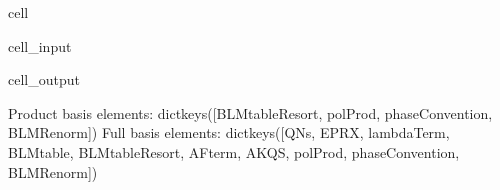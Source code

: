 \documentclass[letterpaper,table,10pt,english]{jupyterBook}
\begin{document}
\begin{sphinxuseclass}{cell}
\begin{sphinxVerbatimInput}
\begin{sphinxuseclass}{cell_input}
\begin{sphinxVerbatim}[commandchars=\\\{\}]
  
\end{sphinxVerbatim}

\end{sphinxuseclass}\end{sphinxVerbatimInput}
\begin{sphinxVerbatimOutput}

\begin{sphinxuseclass}{cell_output}
\begin{sphinxVerbatim}[commandchars=\\\{\}]
Product basis elements: dict\PYGZus{}keys([\PYGZsq{}BLMtableResort\PYGZsq{}, \PYGZsq{}polProd\PYGZsq{}, \PYGZsq{}phaseConvention\PYGZsq{}, \PYGZsq{}BLMRenorm\PYGZsq{}])
Full basis elements: dict\PYGZus{}keys([\PYGZsq{}QNs\PYGZsq{}, \PYGZsq{}EPRX\PYGZsq{}, \PYGZsq{}lambdaTerm\PYGZsq{}, \PYGZsq{}BLMtable\PYGZsq{}, \PYGZsq{}BLMtableResort\PYGZsq{}, \PYGZsq{}AFterm\PYGZsq{}, \PYGZsq{}AKQS\PYGZsq{}, \PYGZsq{}polProd\PYGZsq{}, \PYGZsq{}phaseConvention\PYGZsq{}, \PYGZsq{}BLMRenorm\PYGZsq{}])
\end{sphinxVerbatim}

\end{sphinxuseclass}\end{sphinxVerbatimOutput}

\end{sphinxuseclass}
\end{document}
